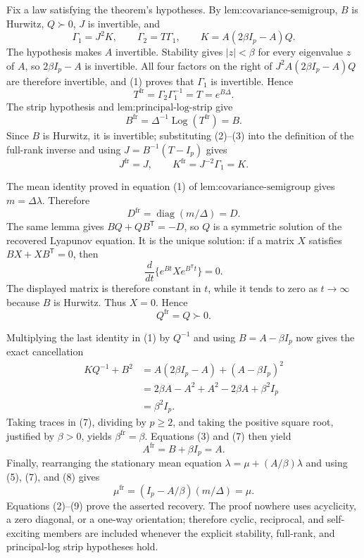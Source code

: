 Fix a law satisfying the theorem's hypotheses.  By \(\text{lem:covariance-semigroup}\), \(B\) is Hurwitz, \(Q\succ0\), \(J\) is invertible, and
\[
 \Gamma_1=J^2K,\qquad \Gamma_2=T\Gamma_1,\qquad
 K=A(2\beta I_p-A)Q.                                             \tag{1}
\]
The hypothesis makes \(A\) invertible.  Stability gives \(|z|<\beta\) for every eigenvalue \(z\) of \(A\), so \(2\beta I_p-A\) is invertible.  All four factors on the right of \(J^2A(2\beta I_p-A)Q\) are therefore invertible, and (1) proves that \(\Gamma_1\) is invertible.  Hence
\[
 T^{\mathrm{fr}}=\Gamma_2\Gamma_1^{-1}=T=e^{B\Delta}.             \tag{2}
\]
The strip hypothesis and \(\text{lem:principal-log-strip}\) give
\[
 B^{\mathrm{fr}}=\Delta^{-1}\operatorname{Log}(T^{\mathrm{fr}})=B. \tag{3}
\]
Since \(B\) is Hurwitz, it is invertible; substituting (2)--(3) into the definition of the full-rank inverse and using \(J=B^{-1}(T-I_p)\) gives
\[
 J^{\mathrm{fr}}=J,\qquad K^{\mathrm{fr}}=J^{-2}\Gamma_1=K.     \tag{4}
\]

The mean identity proved in equation (1) of \(\text{lem:covariance-semigroup}\) gives \(m=\Delta\lambda\).  Therefore
\[
 D^{\mathrm{fr}}=\operatorname{diag}(m/\Delta)=D.                \tag{5}
\]
The same lemma gives \(BQ+QB^{\mathsf T}=-D\), so \(Q\) is a symmetric solution of the recovered Lyapunov equation.  It is the unique solution: if a matrix \(X\) satisfies \(BX+XB^{\mathsf T}=0\), then
\[
 \frac{d}{dt}\{e^{Bt}Xe^{B^{\mathsf T}t}\}=0.
\]
The displayed matrix is therefore constant in \(t\), while it tends to zero as \(t\to\infty\) because \(B\) is Hurwitz.  Thus \(X=0\).  Hence
\[
 Q^{\mathrm{fr}}=Q\succ0.                                       \tag{6}
\]

Multiplying the last identity in (1) by \(Q^{-1}\) and using \(B=A-\beta I_p\) now gives the exact cancellation
\[
\begin{aligned}
 KQ^{-1}+B^2
 &=A(2\beta I_p-A)+(A-\beta I_p)^2\\
 &=2\beta A-A^2+A^2-2\beta A+\beta^2I_p\\
 &=\beta^2I_p.                                                    \tag{7}
\end{aligned}
\]
Taking traces in (7), dividing by \(p\geq2\), and taking the positive square root, justified by \(\beta>0\), yields \(\beta^{\mathrm{fr}}=\beta\).  Equations (3) and (7) then yield
\[
 A^{\mathrm{fr}}=B+\beta I_p=A.                                 \tag{8}
\]
Finally, rearranging the stationary mean equation \(\lambda=\mu+(A/\beta)\lambda\) and using (5), (7), and (8) gives
\[
 \mu^{\mathrm{fr}}=(I_p-A/\beta)(m/\Delta)=\mu.                 \tag{9}
\]
Equations (2)--(9) prove the asserted recovery.  The proof nowhere uses acyclicity, a zero diagonal, or a one-way orientation; therefore cyclic, reciprocal, and self-exciting members are included whenever the explicit stability, full-rank, and principal-log strip hypotheses hold.
